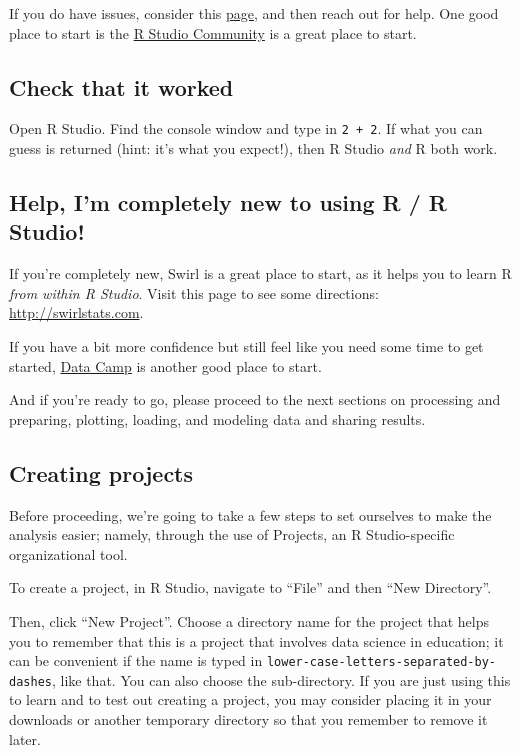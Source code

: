 \documentclass[]{article}
\begin{document}
If you do have issues, consider this
\href{https://datacarpentry.org/R-ecology-lesson/}{page}, and then reach
out for help. One good place to start is the
\href{https://community.rstudio.com/}{R Studio Community} is a great
place to start.

\subsection{Check that it worked}\label{check-that-it-worked}

Open R Studio. Find the console window and type in \texttt{2\ +\ 2}. If
what you can guess is returned (hint: it's what you expect!), then R
Studio \emph{and} R both work.

\subsection{Help, I'm completely new to using R / R
Studio!}\label{help-im-completely-new-to-using-r-r-studio}

If you're completely new, Swirl is a great place to start, as it helps
you to learn R \emph{from within R Studio}. Visit this page to see some
directions: \url{http://swirlstats.com}.

If you have a bit more confidence but still feel like you need some time
to get started, \href{https://www.datacamp.com/}{Data Camp} is another
good place to start.

And if you're ready to go, please proceed to the next sections on
processing and preparing, plotting, loading, and modeling data and
sharing results.

\subsection{Creating projects}\label{creating-projects}

Before proceeding, we're going to take a few steps to set ourselves to
make the analysis easier; namely, through the use of Projects, an R
Studio-specific organizational tool.

To create a project, in R Studio, navigate to ``File'' and then ``New
Directory''.

Then, click ``New Project''. Choose a directory name for the project
that helps you to remember that this is a project that involves data
science in education; it can be convenient if the name is typed in
\texttt{lower-case-letters-separated-by-dashes}, like that. You can also
choose the sub-directory. If you are just using this to learn and to
test out creating a project, you may consider placing it in your
downloads or another temporary directory so that you remember to remove
it later.
\end{document}
